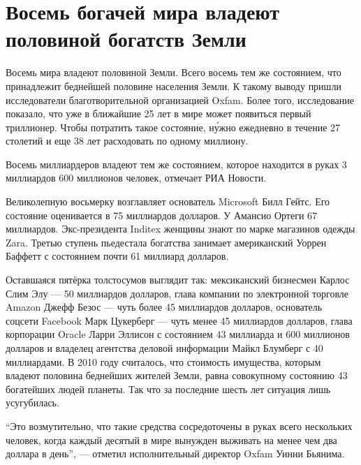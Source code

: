 
\section{Восемь богачей мира владеют половиной богатств Земли}
Восемь  мира владеют половиной  Земли. Всего восемь   тем же состоянием, что принадлежит беднейшей половине населения Земли. К такому выводу пришли исследователи благотворительной организацией Oxfam. Более того, исследование показало, что уже в ближайшие 25 лет в мире может появиться первый триллионер. Чтобы потратить такое состояние, н\'{у}жно ежедневно в течение 27 столетий и еще 38 лет расходовать по одному миллиону.

Восемь миллиардеров владеют тем же состоянием, которое находится в руках 3 миллиардов 600 миллионов человек, отмечает РИА Новости.

Великолепную восьмерку возглавляет основатель Microsoft Билл Гейтс. Его состояние оценивается в 75 миллиардов долларов. У Амансио Ортеги 67 миллиардов. Экс-президента Inditex женщины знают по марке магазинов одежды Zara. Третью ступень пьедестала богатства занимает американский  Уоррен Баффетт с состоянием почти 61 миллиард долларов.

Оставшаяся пятёрка толстосумов выглядит так: мексиканский бизнесмен Карлос Слим Элу --- 50 миллиардов долларов, глава компании по электронной торговле Amazon Джефф Безос --- чуть более 45 миллиардов долларов, основатель соцсети Facebook Марк Цукерберг --- чуть менее 45 миллиардов долларов, глава корпорации Oracle Ларри Эллисон с состоянием 43 миллиарда и 600 миллионов долларов и владелец агентства деловой информации Майкл Блумберг с 40 миллиардами.
В 2010 году считалось, что стоимость имущества, которым владеют половина беднейших жителей Земли, равна совокупному состоянию 43 богатейших людей планеты. Так что за последние шесть лет ситуация лишь усугубилась.

``Это возмутительно, что такие средства сосредоточены в руках всего нескольких человек, когда каждый десятый в мире вынужден выживать на менее чем два доллара в день'', --- отметил исполнительный директор Oxfam Уинни Бьянима.

